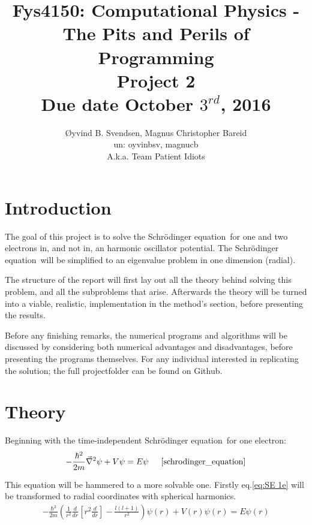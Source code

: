 \documentclass[11pt,a4paper,notitlepage]{article}
\title{\normalsize Fys4150: Computational Physics - The Pits and Perils of Programming \\
\vspace{10mm}
\huge Project 2\\
\vspace{10mm}
\normalsize Due date {\bf October $3^{rd}$, 2016}}
\author{Øyvind B. Svendsen, Magnus Christopher Bareid \\ un: oyvinbsv, magnucb \\ A.k.a. Team Patient Idiots}
\newcommand{\SE}{Schr\"odinger equation}
\newcommand{\laplacian}{\vec{\nabla}^2}
\begin{document}
\noindent
\maketitle
\vspace{10mm}
\begin{abstract}
\end{abstract}

\begin{center}
\end{center}

\newpage
\tableofcontents

\newpage
\section{Introduction}
The goal of this project is to solve the \SE \ for one and two electrons in, and not in, an harmonic oscillator potential. The \SE \ will be simplified to an eigenvalue problem in one dimension (radial). 

The structure of the report will first lay out all the theory behind solving this problem, and all the subproblems that arise. Afterwards the theory will be turned into a viable, realistic, implementation in the method's section, before presenting the results. 

Before any finishing remarks, the numerical programs and algorithms will be discussed by considering both numerical advantages and disadvantages, before presenting the programs themselves. For any individual interested in replicating the solution; the full projectfolder can be found on Github.

\section{Theory}
Beginning with the time-independent \SE\  for one electron:
\begin{equation} \label{eq:SE 1e}
	-\frac{\hbar^2}{2m}\laplacian \psi + V\psi = E\psi 			
	\indent
	\cite[chapter 4, p.132, eq:4.8]{schrodinger_equation}
\end{equation}

This equation will be hammered to a more solvable one. Firstly eq.\eqref{eq:SE 1e} will be transformed to radial coordinates with spherical harmonics.
\begin{align*}
	-\frac{\hbar^2}{2m}\left( \frac{1}{r^2} \frac{d}{dr}\left [ r^2\frac{d}{dr}\right ] - \frac{l(l+1)}{r^2}\right) \psi(r) + V(r)\psi(r) = E\psi(r)
\end{align*}
\end{document}
